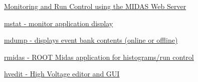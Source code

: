 \begin{DoxyItemize}
\item \hyperlink{RC_mhttpd}{Monitoring and Run Control using the MIDAS Web Server}
\item \hyperlink{RC_Monitor_RC_mstat_utility}{mstat -\/ monitor application display}
\item \hyperlink{RC_Monitor_RC_mdump_utility}{mdump -\/ displays event bank contents (online or offline)}
\item \hyperlink{RC_Monitor_RC_rmidas_utility}{rmidas -\/ ROOT Midas application for histograms/run control}
\item \hyperlink{RC_Monitor_RC_hvedit_utility}{hvedit -\/ High Voltage editor and GUI} \par

\end{DoxyItemize}

\par


